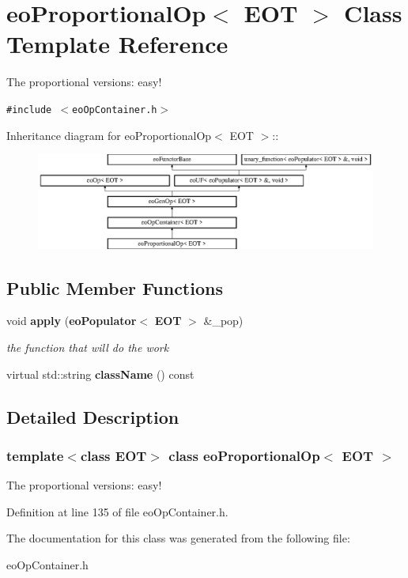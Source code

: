 \section{eo\-Proportional\-Op$<$ EOT $>$ Class Template Reference}
\label{classeo_proportional_op}
The proportional versions: easy!  


{\tt \#include $<$eo\-Op\-Container.h$>$}

Inheritance diagram for eo\-Proportional\-Op$<$ EOT $>$::\begin{figure}[H]
\begin{center}
\leavevmode
\includegraphics[height=3.18544cm]{classeo_proportional_op}
\end{center}
\end{figure}
\subsection*{Public Member Functions}
\begin{CompactItemize}
\item 
void {\bf apply} ({\bf eo\-Populator}$<$ {\bf EOT} $>$ \&\_\-pop)\label{classeo_proportional_op_a0}

\begin{CompactList}\small\item\em the function that will do the work \item\end{CompactList}\item 
virtual std::string {\bf class\-Name} () const \label{classeo_proportional_op_a1}

\end{CompactItemize}


\subsection{Detailed Description}
\subsubsection*{template$<$class EOT$>$ class eo\-Proportional\-Op$<$ EOT $>$}

The proportional versions: easy! 



Definition at line 135 of file eo\-Op\-Container.h.

The documentation for this class was generated from the following file:\begin{CompactItemize}
\item 
eo\-Op\-Container.h\end{CompactItemize}
